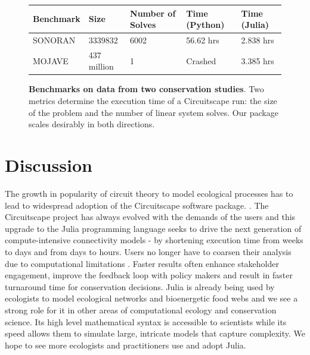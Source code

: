 \documentclass{juliacon}
\begin{document}
\begin{figure}
\begin{tabular}{|l|l|l|l|l|}
\hline
\textbf{Benchmark} & \textbf{Size} & \textbf{Number of Solves} & \textbf{Time (Python)} & \textbf{Time (Julia)} \\ \hline
SONORAN            & 3339832       & 6002                      & 56.62 hrs              & 2.838 hrs             \\ \hline
MOJAVE             & 437 million   & 1                         & Crashed                & 3.385 hrs             \\ \hline
\end{tabular}
\centering
\caption{\textbf{Benchmarks on data from two conservation studies}. Two metrics determine the execution time of a Circuitscape run: the size of the problem and the number of linear system solves. Our package scales desirably in both directions. }
\label{table:bench}
\end{figure}

\section{Discussion}

The growth in popularity of circuit theory to model ecological processes has to lead to widespread adoption of the Circuitscape software package. \cite{mcrae_shah_mohapatra_anantharaman}. The Circuitscape project has always evolved with the demands of the users and this upgrade to the Julia programming language seeks to drive the next generation of compute-intensive connectivity models - by shortening execution time from weeks to days and from days to hours. Users no longer have to coarsen their analysis due to computational limitations \cite{drake2017using}. Faster results often enhance stakeholder engagement, improve the feedback loop with policy makers and result in faster turnaround time for conservation decisions. Julia is already being used by ecologists to model ecological networks \cite{timothee_poisot_2018_1438428} and bioenergetic food webs \cite{delmas_eva_2019_2584373} and we see a strong role for it in other areas of computational ecology and conservation science. Its high level mathematical syntax is accessible to scientists while its speed allows them to simulate large, intricate models that capture complexity. We hope to see more ecologists and practitioners use and adopt Julia. 
\end{document}
